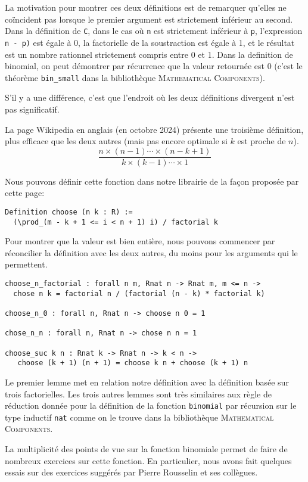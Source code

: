 \documentclass[draft]{jflart}
\newcommand{\mathcomp}{\textsc{Mathematical Components}}
\begin{document}
La motivation pour montrer ces deux définitions est de remarquer
qu'elles ne coïncident pas lorsque le premier argument est strictement
inférieur au second.   Dans la définition de \texttt{C},  dans le cas où
\texttt{n}  est strictement inférieur à \texttt{p}, l'expression \texttt{n -
  p)} est égale à 0, la
factorielle de la soustraction est égale à 1, et le résultat est un
nombre rationnel strictement compris entre 0 et 1.  Dans la definition
de binomial, on peut démontrer par récurrence que la valeur retournée
est 0 (c'est le théorème \texttt{bin\_small} dans la bibliothèque
\mathcomp{}).

S'il y a une différence, c'est que l'endroit où les deux définitions
divergent n'est pas significatif.

La page Wikipedia en anglais (en octobre 2024) présente une troisième
définition, plus
efficace que les deux autres (mais pas encore optimale si \(k\) est proche
de \(n\)).
\[\frac{n \times (n - 1) \cdots \times (n - k + 1)}
{k \times (k - 1) \cdots \times 1}\]

Nous pouvons définir cette fonction dans notre librairie de la façon
proposée par cette page:
\begin{verbatim}
Definition choose (n k : R) :=
  (\prod_(m - k + 1 <= i < n + 1) i) / factorial k
\end{verbatim}

Pour montrer que la valeur est bien entière, nous pouvons commencer
par réconcilier la définition avec les deux autres, du moins pour les
arguments qui le permettent.
\begin{verbatim}
choose_n_factorial : forall n m, Rnat n -> Rnat m, m <= n -> 
  chose n k = factorial n / (factorial (n - k) * factorial k)

choose_n_0 : forall n, Rnat n -> choose n 0 = 1

chose_n_n : forall n, Rnat n -> chose n n = 1

choose_suc k n : Rnat k -> Rnat n -> k < n ->
   choose (k + 1) (n + 1) = choose k n + choose (k + 1) n
\end{verbatim}
Le premier lemme met en relation notre définition avec
la définition basée sur trois factorielles.  Les trois autres
lemmes sont très similaires aux règle de réduction donnée pour
la définition de la fonction \texttt{binomial} par récursion sur le type
inductif \texttt{nat} comme on le trouve dans la bibliothèque
\mathcomp{}.

La multiplicité des points de vue sur la fonction binomiale permet de
faire de nombreux exercices sur cette fonction.  En particulier, nous
avons fait quelques essais sur des exercices suggérés par Pierre
Rousselin et ses collègues.
\end{document}
